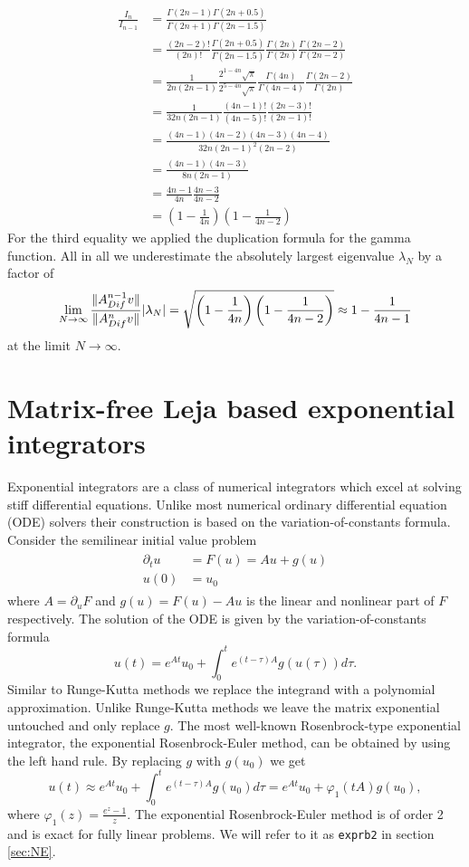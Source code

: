 \documentclass{scrartcl}
\begin{document}
\begin{align*}
\frac{I_n}{I_{n-1}} &= 
\frac{\Gamma(2n - 1)\Gamma(2n + 0.5)}{\Gamma(2n + 1)\Gamma(2n - 1.5)} \\&=   
\frac{(2n - 2)!}{(2n)!}
\frac{\Gamma(2n + 0.5)}{\Gamma(2n - 1.5)}
\frac{\Gamma(2n)}{\Gamma(2n)}
\frac{\Gamma(2n-2)}{\Gamma(2n-2)} \\&=
\frac{1}{2n(2n-1)} 
\frac{2^{1-4n}\sqrt\pi}{2^{5-4n}\sqrt\pi}
\frac{\Gamma(4n)}{\Gamma(4n-4)}
\frac{\Gamma(2n-2)}{\Gamma(2n)} \\&=
\frac{1}{32n(2n-1)} 
\frac{(4n-1)!}{(4n-5)!}
\frac{(2n-3)!}{(2n-1)!} \\&=
\frac{(4n-1)(4n-2)(4n-3)(4n-4)}{32n(2n-1)^2(2n-2)} \\&=
\frac{(4n-1)(4n-3)}{8n(2n-1)} \\&=
\frac{4n-1}{4n}\frac{4n-3}{4n-2} \\&=
\left(1-\frac{1}{4n}\right)\left(1-\frac{1}{4n-2}\right)
\end{align*}
For the third equality we applied the duplication formula for the gamma function. All in all we underestimate the absolutely largest eigenvalue $\lambda_N$ by a factor of 
\[
\lim_{N\to\infty}\frac{\lVert A_{Dif}^{n-1}v\rVert}{\lVert A_{Dif}^{n}v\rVert}\lvert\lambda_N\rvert =
\sqrt{\left(1-\frac{1}{4n}\right)\left(1-\frac{1}{4n-2}\right)} \approx
1-\frac{1}{4n-1}
\]
at the limit $N\to\infty$. 

\section{Matrix-free Leja based exponential integrators}
Exponential integrators are a class of numerical integrators which excel at solving stiff differential equations. Unlike most numerical ordinary differential equation (ODE) solvers their construction is based on the variation-of-constants formula. Consider the semilinear initial value problem
\begin{align}
	\begin{split}
	\partial_tu &= F(u) = Au + g(u) \\ 
	u(0) &= u_0
	\end{split}\label{semilinear}
\end{align}
where $A = \partial_uF$ and $g(u) = F(u)-Au$ is the linear and nonlinear part of $F$ respectively. The solution of the ODE is given by the variation-of-constants formula
\[
u(t) = e^{At}u_0 + \int_{0}^{t}e^{(t-\tau)A}g(u(\tau))d\tau.
\]
Similar to Runge-Kutta methods we replace the integrand with a polynomial approximation. Unlike Runge-Kutta methods we leave the matrix exponential untouched and only replace $g$. The most well-known Rosenbrock-type exponential integrator, the exponential Rosenbrock-Euler method, can be obtained by using the left hand rule. By replacing $g$ with $g(u_0)$ we get
\[
u(t) \approx e^{At}u_0 + \int_{0}^{t}e^{(t-\tau)A}g(u_0)d\tau = e^{At}u_0 + \varphi_1(tA)g(u_0),
\]
where $\varphi_1(z) = \frac{e^z-1}z$. The exponential Rosenbrock-Euler method is of order 2 and is exact for fully linear problems. We will refer to it as \texttt{exprb2} in section \ref{sec:NE}.
\end{document}
